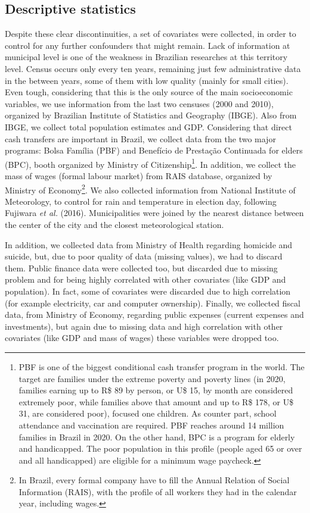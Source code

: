 \documentclass[
  12pt,
]{article}
\begin{document}
\hypertarget{descriptive-statistics}{%
\subsection{Descriptive statistics}\label{descriptive-statistics}}

Despite these clear discontinuities, a set of covariates were collected,
in order to control for any further confounders that might remain. Lack
of information at municipal level is one of the weakness in Brazilian
researches at this territory level. Census occurs only every ten years,
remaining just few administrative data in the between years, some of
them with low quality (mainly for small cities). Even tough, considering
that this is the only source of the main socioeconomic variables, we use
information from the last two censuses (2000 and 2010), organized by
Brazilian Institute of Statistics and Geography (IBGE). Also from IBGE,
we collect total population estimates and GDP. Considering that direct
cash transfers are important in Brazil, we collect data from the two
major programs: Bolsa Família (PBF) and Benefício de Prestação
Continuada for elders (BPC), booth organized by Ministry of
Citizenship\footnote{PBF is one of the biggest conditional cash transfer
  program in the world. The target are families under the extreme
  poverty and poverty lines (in 2020, families earning up to R\$ 89 by
  person, or U\$ 15, by month are considered extremely poor, while
  families above that amount and up to R\$ 178, or U\$ 31, are
  considered poor), focused one children. As counter part, school
  attendance and vaccination are required. PBF reaches around 14 million
  families in Brazil in 2020. On the other hand, BPC is a program for
  elderly and handicapped. The poor population in this profile (people
  aged 65 or over and all handicapped) are eligible for a minimum wage
  paycheck.}. In addition, we collect the mass of wages (formal labour
market) from RAIS database, organized by Ministry of Economy\footnote{In
  Brazil, every formal company have to fill the Annual Relation of
  Social Information (RAIS), with the profile of all workers they had in
  the calendar year, including wages.}. We also collected information
from National Institute of Meteorology, to control for rain and
temperature in election day, following Fujiwara \emph{et al.} (2016).
Municipalities were joined by the nearest distance between the center of
the city and the closest meteorological station.

In addition, we collected data from Ministry of Health regarding
homicide and suicide, but, due to poor quality of data (missing values),
we had to discard them. Public finance data were collected too, but
discarded due to missing problem and for being highly correlated with
other covariates (like GDP and population). In fact, some of covariates
were discarded due to high correlation (for example electricity, car and
computer ownership). Finally, we collected fiscal data, from Ministry of
Economy, regarding public expenses (current expenses and investments),
but again due to missing data and high correlation with other covariates
(like GDP and mass of wages) these variables were dropped too.
\end{document}
